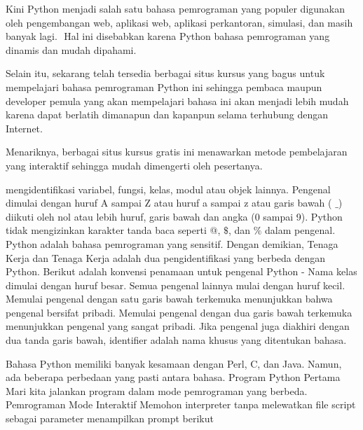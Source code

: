 \noindent 
{\fontsize{14pt}{14pt}\selectfont Kini Python menjadi salah satu bahasa pemrograman yang populer digunakan oleh pengembangan $  $web, aplikasi $  $web, aplikasi perkantoran, simulasi, dan masih banyak lagi. $  $ Hal ini disebabkan karena Python bahasa pemrograman yang dinamis dan mudah dipahami. \\} \par
\noindent 
{\fontsize{14pt}{14pt}\selectfont Selain itu, sekarang telah tersedia berbagai situs kursus yang bagus untuk mempelajari bahasa pemrograman Python ini sehingga pembaca maupun developer pemula yang akan mempelajari bahasa ini akan menjadi lebih mudah karena dapat berlatih dimanapun dan kapanpun selama terhubung dengan Internet. \\} \par
\noindent 
{\fontsize{14pt}{14pt}\selectfont Menariknya, berbagai situs kursus gratis ini menawarkan metode pembelajaran yang interaktif sehingga mudah dimengerti oleh pesertanya. \\} \par
\vspace{14pt}
\noindent 
{\fontsize{14pt}{14pt}\selectfont mengidentifikasi variabel, fungsi, kelas, modul atau objek lainnya. Pengenal dimulai dengan huruf A sampai Z atau huruf a sampai z atau garis bawah ( $  \_  $) diikuti oleh nol atau lebih huruf, garis bawah dan angka (0 sampai 9). Python tidak mengizinkan karakter tanda baca seperti @,  $  \$  $, dan $  \%  $ dalam pengenal. Python adalah bahasa pemrograman yang sensitif. Dengan demikian, Tenaga Kerja dan Tenaga Kerja adalah dua pengidentifikasi yang berbeda dengan Python. Berikut adalah konvensi penamaan untuk pengenal Python - Nama kelas dimulai dengan huruf besar. Semua pengenal lainnya mulai dengan huruf kecil. Memulai pengenal dengan satu garis bawah terkemuka menunjukkan bahwa pengenal bersifat pribadi. Memulai pengenal dengan dua garis bawah terkemuka menunjukkan pengenal yang sangat pribadi. Jika pengenal juga diakhiri dengan dua tanda garis bawah, identifier adalah nama khusus yang ditentukan bahasa. \\} \par
\vspace{14pt}
\noindent 
{\fontsize{14pt}{14pt}\selectfont \vspace{\baselineskip}
Bahasa Python memiliki banyak kesamaan dengan Perl, C, dan Java. Namun, ada beberapa perbedaan yang pasti antara bahasa. Program Python Pertama Mari kita jalankan program dalam mode pemrograman yang berbeda. Pemrograman Mode Interaktif Memohon interpreter tanpa melewatkan file script sebagai parameter menampilkan prompt berikut  \\} \par
